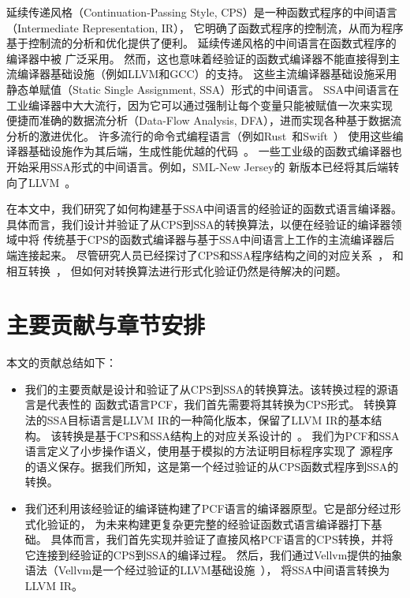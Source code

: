 延续传递风格（Continuation-Passing Style, CPS）是一种函数式程序的中间语言（Intermediate Representation, IR），
它明确了函数式程序的控制流，从而为程序基于控制流的分析和优化提供了便利。
延续传递风格的中间语言在函数式程序的编译器中被
广泛采用\cite{belanger-cpp2013,dargaye2009verification,zoe-oopsla2021,zoe-icfp2021,wang-esop2016}。
然而，这也意味着经验证的函数式编译器不能直接得到主流编译器基础设施（例如LLVM和GCC）的支持。
这些主流编译器基础设施采用静态单赋值（Static Single Assignment, SSA）形式的中间语言。 
SSA中间语言在工业编译器中大大流行，因为它可以通过强制让每个变量只能被赋值一次来实现
便捷而准确的数据流分析（Data-Flow Analysis, DFA），进而实现各种基于数据流分析的激进优化。
许多流行的命令式编程语言（例如Rust~\cite{balasubramanian2017system}和Swift~\cite{zhang2012swift}）
使用这些编译器基础设施作为其后端，生成性能优越的代码~\cite{lattner2006introduction}。
一些工业级的函数式编译器也开始采用SSA形式的中间语言。例如，SML-New Jersey的
新版本已经将其后端转向了LLVM~\cite{farvardin2020new}。

在本文中，我们研究了如何构建基于SSA中间语言的经验证的函数式语言编译器。
具体而言，我们设计并验证了从CPS到SSA的转换算法，以便在经验证的编译器领域中将
传统基于CPS的函数式编译器与基于SSA中间语言上工作的主流编译器后端连接起来。
尽管研究人员已经探讨了CPS和SSA程序结构之间的对应关系~\cite{appel1998ssa,ssabook}，
和相互转换~\cite{farvardin2020new,kelsey1995correspondence}，
但如何对转换算法进行形式化验证仍然是待解决的问题。

\section{主要贡献与章节安排}

本文的贡献总结如下：

\begin{itemize}
    \item
    我们的主要贡献是设计和验证了从CPS到SSA的转换算法。该转换过程的源语言是代表性的
    函数式语言PCF\cite{plotkin1977lcf}，我们首先需要将其转换为CPS形式。
    转换算法的SSA目标语言是LLVM IR的一种简化版本，保留了LLVM IR的基本结构。
    该转换是基于CPS和SSA结构上的对应关系设计的~\cite{appel1998ssa,kelsey1995correspondence}。
    我们为PCF和SSA语言定义了小步操作语义，使用基于模拟的方法证明目标程序实现了
    源程序的语义保存。据我们所知，这是第一个经过验证的从CPS函数式程序到SSA的转换。
    
    \item 
    我们还利用该经验证的编译链构建了PCF语言的编译器原型。它是部分经过形式化验证的，
    为未来构建更复杂更完整的经验证函数式语言编译器打下基础。
    具体而言，我们首先实现并验证了直接风格PCF语言的CPS转换，并将它连接到经验证的CPS到SSA的编译过程。
    然后，我们通过Vellvm提供的抽象语法（Vellvm是一个经过验证的LLVM基础设施~\cite{zakowski2021modular}），
    将SSA中间语言转换为LLVM IR。
    
\end{itemize}

